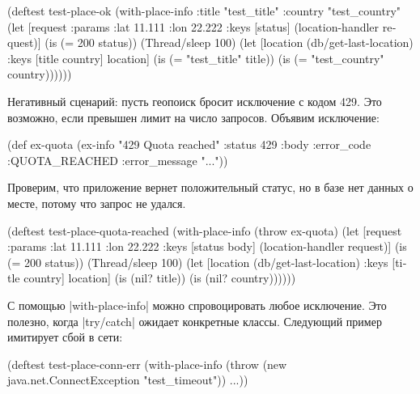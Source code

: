 \begin{english}
  \begin{clojure}
(deftest test-place-ok
  (with-place-info
    {:title "test_title"
     :country "test_country"}
    (let [request {:params {:lat 11.111 :lon 22.222}}
          {:keys [status]} (location-handler request)]
      (is (= 200 status))
      (Thread/sleep 100)
      (let [location (db/get-last-location)
            {:keys [title country]} location]
        (is (= "test_title" title))
        (is (= "test_country" country))))))
  \end{clojure}
\end{english}

Негативный сценарий: пусть геопоиск бросит исключение с кодом 429. Это
возможно, если превышен лимит на число запросов. Объявим исключение:

\begin{english}
  \begin{clojure}
(def ex-quota
  (ex-info "429 Quota reached"
           {:status 429
            :body {:error_code :QUOTA_REACHED
                   :error_message "..."}}))
  \end{clojure}
\end{english}

\noindent
Проверим, что приложение вернет положительный статус, но в базе нет данных о
месте, потому что запрос не удался.

\begin{english}
  \begin{clojure}
(deftest test-place-quota-reached
  (with-place-info (throw ex-quota)
    (let [request {:params {:lat 11.111 :lon 22.222}}
          {:keys [status body]} (location-handler request)]
      (is (= 200 status))
      (Thread/sleep 100)
      (let [location (db/get-last-location)
            {:keys [title country]} location]
        (is (nil? title))
        (is (nil? country))))))
  \end{clojure}
\end{english}

С помощью \spverb|with-place-info| можно спровоцировать любое исключение. Это
полезно, когда \spverb|try/catch| ожидает конкретные классы. Следующий пример
имитирует сбой в сети:

\begin{english}
  \begin{clojure}
(deftest test-place-conn-err
  (with-place-info
    (throw (new java.net.ConnectException "test_timeout"))
    ...))
  \end{clojure}
\end{english}

